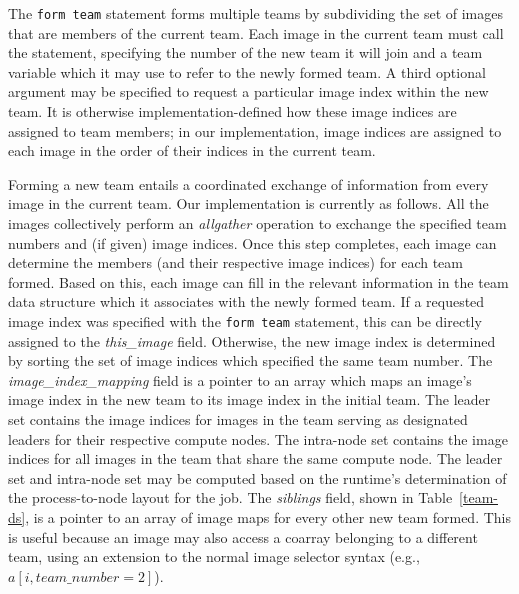 
The \texttt{form team} statement forms multiple teams by subdividing the set
of images that are members of the current team. Each image in the current
team must call the statement, specifying the number of the new team it will
join and a team variable which it may use to refer to the newly formed team. A
third optional argument may be specified to request a particular image index
within the new team. It is otherwise implementation-defined how these image
indices are assigned to team members; in our implementation, image indices are
assigned to each image in the order of their indices in the current team.

Forming a new team entails a coordinated exchange of information from every
image in the current team. Our implementation is currently as follows. All the
images collectively perform an \textit{allgather} operation to exchange the
specified team numbers and (if given) image indices. Once this step completes,
each image can determine the members (and their respective image indices) for
each team formed. Based on this, each image can fill in the relevant
information in the team data structure which it associates with the newly
formed team. If a requested image index was specified with the \texttt{form
team} statement, this can be directly assigned to the \textit{this\_image}
field. Otherwise, the new image index is determined by sorting the set of
image indices which specified the same team number. The
\textit{image\_index\_mapping} field is a pointer to an array which maps an
image's image index in the new team to its image index in the initial team.
The leader set contains the image indices for images in the team serving as designated leaders
for their respective compute nodes. The intra-node set contains the
image indices for all images in the team that share the same compute node.
The leader set and intra-node set may be computed based on the runtime's
determination of the process-to-node layout for the job. The \textit{siblings}
field, shown in Table~\ref{team-ds}, is a pointer to an array of image maps
for every other new team formed. This is useful because an image may also
access a coarray belonging to a different team, using an extension to the
normal image selector syntax (e.g., $a[i, team\_number=2]$).  

